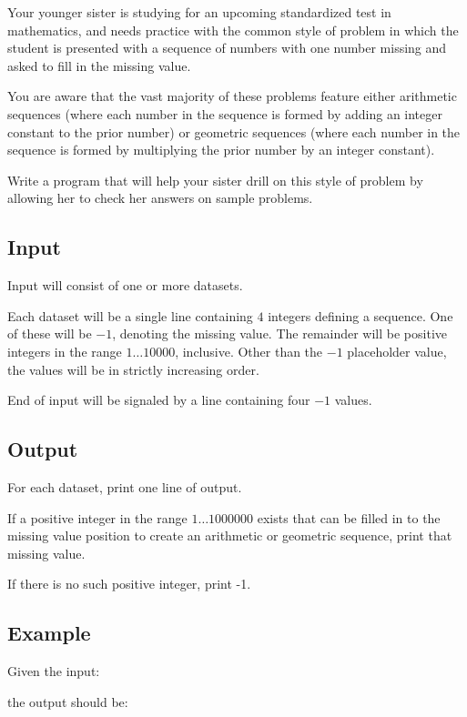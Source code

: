 

Your younger sister is studying for an upcoming standardized test in
mathematics, and needs practice with the common style of problem in
which the student is presented with a sequence of numbers with one
number missing and asked to fill in the missing value.

You are aware that the vast majority of these problems feature either
arithmetic sequences (where each number in the sequence is formed by
adding an integer constant to the prior number) or geometric sequences (where
each number in the sequence is formed by multiplying the prior number
by an integer constant).

Write a program that will help your sister drill on this style of
problem by allowing her to check her answers on sample problems.


\subsection*{Input}

Input will consist of one or more datasets.

Each dataset will be a single line containing $4$ integers defining a
sequence. One of these will be $-1$, denoting the missing value. The
remainder will be positive integers in the range $1\ldots \num{10000}$,
inclusive. Other than the $-1$ placeholder value, the values will be
in strictly increasing order.

End of input will be signaled by a line containing four $-1$
values.

\subsection*{Output}

For each dataset, print one line of output. 

If a positive integer in the range $1 \ldots \num{1000000}$ exists that
can be filled in to the missing value position to create an
arithmetic or geometric sequence, print that missing value. 

If there is no such positive integer, print -1.




\subsection*{Example}

Given the input:



the output should be:




